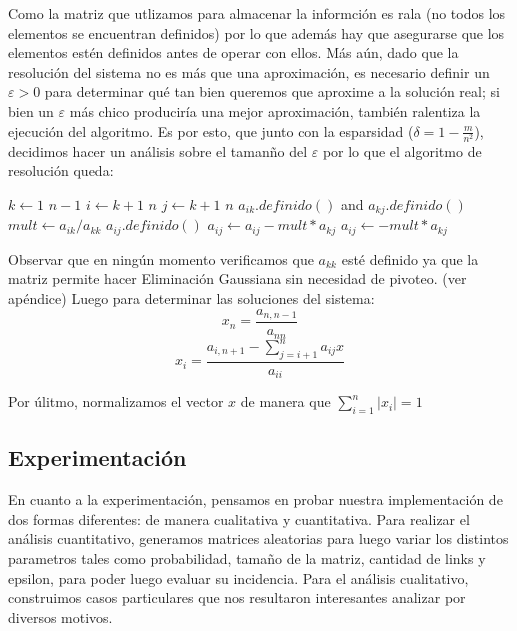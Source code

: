 \par Como la matriz que utlizamos para almacenar la informci\'on es rala (no todos los elementos se encuentran definidos) por lo que 
adem\'as hay que asegurarse que los elementos est\'en definidos antes de operar con ellos. M\'as a\'un, dado que la resoluci\'on
del sistema no es m\'as que una aproximaci\'on, es necesario definir un $\varepsilon > 0$ para determinar qu\'e tan bien queremos que 
aproxime a la soluci\'on real; si bien un $\varepsilon$ m\'as chico producir\'ia una mejor aproximaci\'on, tambi\'en ralentiza la
ejecuci\'on del algoritmo. Es por esto, que junto con la esparsidad ($\delta = 1 - \frac{m}{n^2}$), decidimos hacer un an\'alisis
sobre el taman\~no del $\varepsilon$ por lo que el algoritmo de resoluci\'on queda:

\begin{codebox}\label{elimGaussRala}
\li \For $k \gets 1$ \To $n-1$
    \Do
\li     \For $i \gets k+1$ \To $n$
            \Do
\li         \For $j \gets k+1$ \To $n$
                \Do
\li                \If $a_{ik}.definido()$ and $a_{kj}.definido()$
                        \Then
\li                        $mult \gets a_{ik}/a_{kk}$
\li                     \If $a_{ij}.definido()$
                            \Then
\li                          $a_{ij} \gets a_{ij} - mult*a_{kj}$
\li                     \Else
\li                          $a_{ij} \gets - mult*a_{kj}$
                \End
            \End
        \End
\end{codebox}
Observar que en ning\'un momento verificamos que $a_{kk}$ est\'e definido ya que la matriz permite hacer Eliminación Gaussiana sin necesidad
de pivoteo. (ver ap\'endice)
Luego para determinar las soluciones del sistema\cite{burden}:
\[
    x_n = \frac{a_{n,n-1}}{a_{nn}}
    \]
    \[
    x_i = \frac {a_{i,n+1} - \sum_{j=i+1}^{n} a_{ij}x} {a_{ii}}
    \]

Por \'ulitmo, normalizamos el vector $x$ de manera que $\sum^{n}_{i=1} |x_i| = 1$
\subsection*{Experimentaci\'on}

\par
En cuanto a la experimentaci\'on, pensamos en probar nuestra implementaci\'on de dos formas diferentes: de manera cualitativa y cuantitativa.
Para realizar el an\'alisis cuantitativo, generamos matrices aleatorias para luego variar los distintos parametros tales como probabilidad, 
tamaño de la matriz, cantidad de links y epsilon, para poder luego evaluar su incidencia. Para el an\'alisis cualitativo, construimos casos particulares
que nos resultaron interesantes analizar por diversos motivos.

